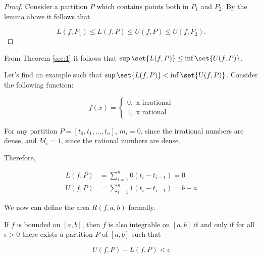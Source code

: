 \documentclass[11pt]{scrartcl}
\begin{document}
\begin{proof}
  Consider a partition \(P\) which contains points both in \(P_{1}\)
  and \(P_{2}\). By the lemma above it follows that


  \begin{equation*}
    L(f, P_{1}) \leq L(f, P) \leq U(f, P) \leq U(f, P_{2}).
  \end{equation*}
\end{proof}

From Theorem \ref{sec:1} it follows that
\(\sup \set{L(f, P)} \leq \inf\set{U(f, P)}\).

\begin{example}
  Let's find an example such that \(\sup \set{L(f, P)} < \inf\set{U(f, P)}\).
  Consider the following function:

\[f(x) = \begin{cases}
    0,\text{ x irrational}\\
    1,\text{ x rational}
  \end{cases}\]

For any partition \(P = [t_{0}, t_{1}, \dots, t_{n}]\), \(m_{i} = 0\),
since the irrational numbers are dense, and \(M_{i} = 1\), since the
rational numbers are dense.

Therefore,

\begin{align}
  L(f, P) &= \sum_{i=1}^{n}0(t_{i} - t_{i-1}) = 0\\
  U(f, P) &= \sum_{i=1}^{n}1(t_{i} - t_{i-1}) = b - a
\end{align}
\end{example}

We now can define the area \(R(f, a, b)\) formally.


\begin{theorem}
  If \(f\) is bounded on \([a, b]\), then \(f\) is also integrable on
  \([a,b]\) if and only if for all \( \epsilon > 0\) there exists a
  partition \(P\) of \([a, b]\) such that

  \begin{equation*}
    U(f, P) - L(f, P) < \epsilon
  \end{equation*}

\end{theorem}
\end{document}
